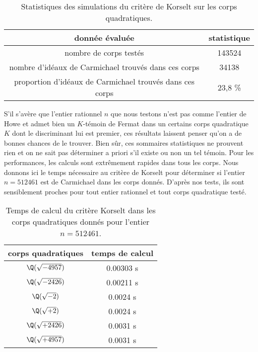 \begin{table}[H]\label{statistiques-quadra}
	\begin{center}
		\begin{tabular}{|c|c|}
			\hline
			donnée évaluée & statistique \\
			\hline
			\hline
			nombre de corps testés & 143524 \\\hline
			nombre d'idéaux de Carmichael trouvés dans ces corps & 34138 \\\hline
			proportion d'idéaux de Carmichael trouvés dans ces corps & 23,8 \% \\\hline
		\end{tabular}
		\caption{Statistiques des simulations du critère de Korselt sur les corps quadratiques.}
	\end{center}
\end{table}

S'il s'avère que l'entier rationnel $n$ que nous testons n'est pas comme l'entier de Howe et admet bien un $K$-témoin de Fermat dans un certains corps quadratique $K$ dont le discriminant lui est premier, ces résultats laissent penser qu'on a de bonnes chances de le trouver. Bien sûr, ces sommaires statistiques ne prouvent rien et on ne sait pas déterminer a priori s'il existe ou non un tel témoin. Pour les performances, les calculs sont extrêmement rapides dans tous les corps. Nous donnons ici le temps nécessaire au critère de Korselt pour déterminer si l'entier $n = 512461$ est de Carmichael dans les corps donnés. D'après nos tests, ils sont sensiblement proches pour tout entier rationnel et tout corps quadratique testé.

\begin{table}[H]
	\begin{center}
		\begin{tabular}{|c|c|}
			\hline
			corps quadratiques & temps de calcul \\
			\hline
			\hline
			$\Q(\sqrt{-4957})$ & 0.00303 s \\\hline
			$\Q(\sqrt{-2426})$ & 0.00211 s \\\hline
			$\Q(\sqrt{-2})$ & 0.0024 s \\\hline
			$\Q(\sqrt{+2})$ & 0.0024 s \\\hline
			$\Q(\sqrt{+2426})$ & 0.0031 s \\\hline
			$\Q(\sqrt{+4957})$ & 0.0031 s \\\hline
		\end{tabular}
		\caption{Temps de calcul du critère Korselt dans les corps quadratiques donnés pour l'entier $n=512461$.}
	\end{center}
\end{table}
